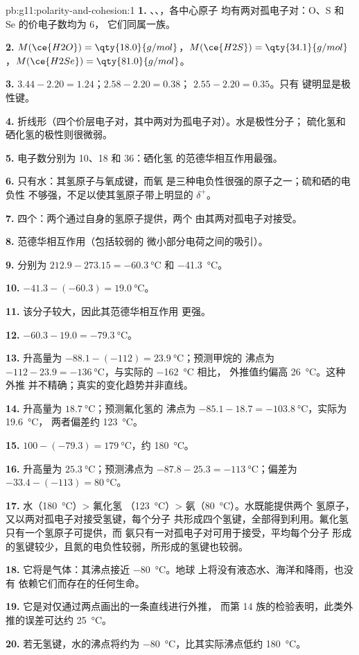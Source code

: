 \begin{solution}{pb:g11:polarity-and-cohesion:1}
\textbf{1.} 、、，各中心原子
均有两对孤电子对：O、S 和 Se 的价电子数均为 6，
它们同属一族。

\textbf{2.} $M(\ce{H2O}) = \qty{18.0}{g/mol}$，$M(\ce{H2S}) =
\qty{34.1}{g/mol}$，$M(\ce{H2Se}) = \qty{81.0}{g/mol}$。

\textbf{3.} $3.44 - 2.20 = 1.24$；$2.58 - 2.20 = 0.38$；
$2.55 - 2.20 = 0.35$。只有  键明显是极性键。

\textbf{4.} 折线形（四个价层电子对，其中两对为孤电子对）。水是极性分子；
硫化氢和硒化氢的极性则很微弱。

\textbf{5.} 电子数分别为 10、18 和 36：硒化氢
的范德华相互作用最强。

\textbf{6.} 只有水：其氢原子与氧成键，而氧
是三种电负性很强的原子之一；硫和硒的电负性
不够强，不足以使其氢原子带上明显的
$\delta^+$。

\textbf{7.} 四个：两个通过自身的氢原子提供，两个
由其两对孤电子对接受。

\textbf{8.} 范德华相互作用（包括较弱的
微小部分电荷之间的吸引）。

\textbf{9.} 分别为 $212.9 - 273.15 = \qty{-60.3}{\celsius}$ 和
\qty{-41.3}{\celsius}。

\textbf{10.} $-41.3 - (-60.3) = \qty{19.0}{\celsius}$。

\textbf{11.} 该分子较大，因此其范德华相互作用
更强。

\textbf{12.} $-60.3 - 19.0 = \qty{-79.3}{\celsius}$。

\textbf{13.} 升高量为 $-88.1 - (-112) = \qty{23.9}{\celsius}$；预测甲烷的
沸点为 $-112 - 23.9 = \qty{-136}{\celsius}$，与实际的 \qty{-162}{\celsius} 相比，
外推值约偏高 \qty{26}{\celsius}。这种外推
并不精确；真实的变化趋势并非直线。

\textbf{14.} 升高量为 $\qty{18.7}{\celsius}$；预测氟化氢的
沸点为 $-85.1 - 18.7 = \qty{-103.8}{\celsius}$，实际为 \qty{19.6}{\celsius}，
两者偏差约 \qty{123}{\celsius}。

\textbf{15.} $100 - (-79.3) = \qty{179}{\celsius}$，约
\qty{180}{\celsius}。

\textbf{16.} 升高量为 $\qty{25.3}{\celsius}$；预测沸点为 $-87.8 - 25.3 =
\qty{-113}{\celsius}$；偏差为 $-33.4 - (-113) = \qty{80}{\celsius}$。

\textbf{17.} 水（\qty{180}{\celsius}）> 氟化氢
（\qty{123}{\celsius}）> 氨（\qty{80}{\celsius}）。水既能提供两个
氢原子，又以两对孤电子对接受氢键，每个分子
共形成四个氢键，全部得到利用。氟化氢只有一个氢原子可提供，而
氨只有一对孤电子对可用于接受，平均每个分子
形成的氢键较少，且氮的电负性较弱，所形成的氢键也较弱。

\textbf{18.} 它将是气体：其沸点接近 \qty{-80}{\celsius}。地球
上将没有液态水、海洋和降雨，也没有
依赖它们而存在的任何生命。

\textbf{19.} 它是对仅通过两点画出的一条直线进行外推，
而第 14 族的检验表明，此类外推的误差可达约
\qty{25}{\celsius}。

\textbf{20.} 若无氢键，水的沸点将约为
\qty{-80}{\celsius}，比其实际沸点低约
\qty{180}{\celsius}。
\end{solution}
